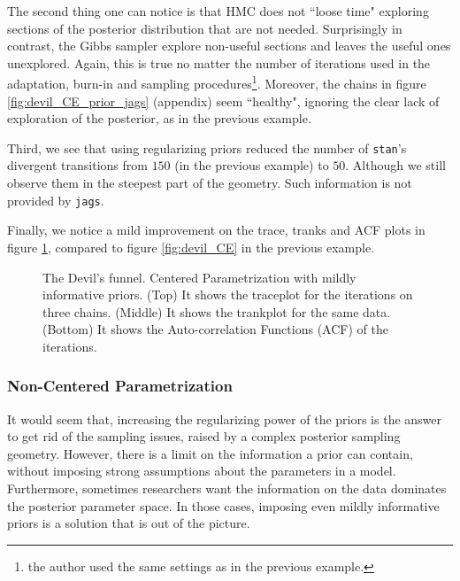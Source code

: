 The second thing one can notice is that HMC does not ``loose time" exploring sections of the posterior distribution that are not needed. Surprisingly in contrast, the Gibbs sampler explore non-useful sections and leaves the useful ones unexplored. Again, this is true no matter the number of iterations used in the adaptation, burn-in and sampling procedures\footnote{the author used the same settings as in the previous example.}. Moreover, the chains in figure \ref{fig:devil_CE_prior_jags} (appendix) seem ``healthy", ignoring the clear lack of exploration of the posterior, as in the previous example.

Third, we see that using regularizing priors reduced the number of \texttt{stan}'s divergent transitions from $150$ (in the previous example) to $50$. Although we still observe them in the steepest part of the geometry. Such information is not provided by \texttt{jags}.

Finally, we notice a mild improvement on the trace, tranks and ACF plots in figure \ref{fig:devil_prior}, compared to figure \ref{fig:devil_CE} in the previous example.
%
\begin{figure}[h] 
	\centering
	\begin{subfigure}
		\texttt{[image: 2\_trace\_CE\_priors]}
	\end{subfigure}
	\begin{subfigure}
		\texttt{[image: 2\_trank\_CE\_priors]}
	\end{subfigure}
	\begin{subfigure}
		\texttt{[image: 2\_acf\_CE\_priors]}
	\end{subfigure}
	\caption[The Devil's funnel. Centered Parametrization with prior information.]%
	{The Devil's funnel. Centered Parametrization with mildly informative priors. (Top) It shows the traceplot for the iterations on three chains. (Middle) It shows the trankplot for the same data. (Bottom) It shows the Auto-correlation Functions (ACF) of the iterations.}
	\label{fig:devil_prior}
\end{figure}


\subsubsection{Non-Centered Parametrization}

It would seem that, increasing the regularizing power of the priors is the answer to get rid of the sampling issues, raised by a complex posterior sampling geometry. However, there is a limit on the information a prior can contain, without imposing strong assumptions about the parameters in a model. Furthermore, sometimes researchers want the information on the data dominates the posterior parameter space. In those cases, imposing even mildly informative priors is a solution that is out of the picture.

